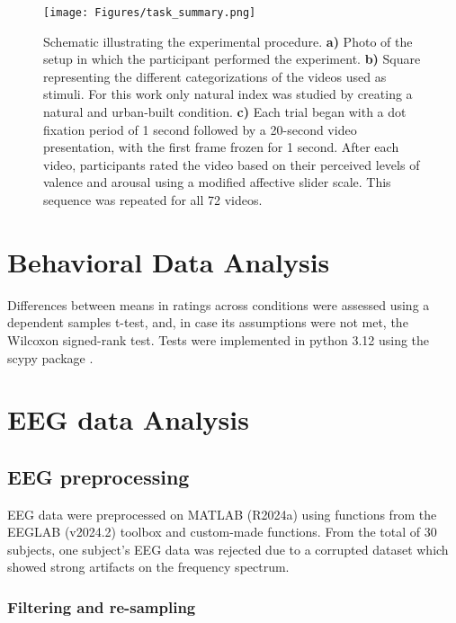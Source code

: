 \begin{figure}[H]
	\centering
	\texttt{[image: Figures/task\_summary.png]}
	\caption{Schematic illustrating the experimental procedure. \textbf{a)} Photo of the setup in which the participant performed the experiment. \textbf{b)} Square representing the different categorizations of the videos used as stimuli. For this work only natural index was studied by creating a natural and urban-built condition. \textbf{c)} Each trial began with a dot fixation period of 1 second followed by a 20-second video presentation, with the first frame frozen for 1 second. After each video, participants rated the video based on their perceived levels of valence and arousal using a modified affective slider scale. This sequence was repeated for all 72 videos. \label{fig:task_scheme}}
\end{figure}


\section{Behavioral Data Analysis}
\label{behavioral_methods}
 
Differences between means in ratings across conditions were assessed using a dependent samples t-test, and, in case its assumptions were not met, the Wilcoxon signed-rank test. Tests were implemented in python 3.12 using the scypy package \cite{2020SciPy-NMeth}.

\section{EEG data Analysis}
\label{section:eeg_methods}


\subsection{EEG preprocessing}
\label{section:preprocessing}

EEG data were preprocessed on MATLAB (R2024a) using functions from the EEGLAB (v2024.2) toolbox \cite{delormeEEGLABOpensourceToolbox2004} and custom-made functions. From the total of 30 subjects, one subject's EEG data was rejected due to a corrupted dataset which showed strong artifacts on the  frequency spectrum.

\subsubsection{Filtering and re-sampling}

